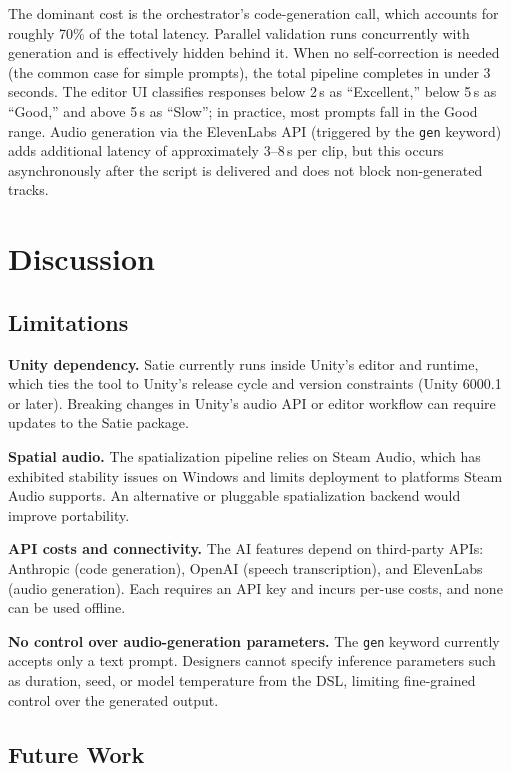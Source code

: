 \documentclass[sigconf,anonymous,review]{nimeart}
\begin{document}
The dominant cost is the orchestrator's code-generation call, which accounts for roughly 70\% of the total latency. Parallel validation runs concurrently with generation and is effectively hidden behind it. When no self-correction is needed (the common case for simple prompts), the total pipeline completes in under 3 seconds. The editor UI classifies responses below 2\,s as ``Excellent,'' below 5\,s as ``Good,'' and above 5\,s as ``Slow''; in practice, most prompts fall in the Good range. Audio generation via the ElevenLabs API (triggered by the \texttt{gen} keyword) adds additional latency of approximately 3--8\,s per clip, but this occurs asynchronously after the script is delivered and does not block non-generated tracks.

\section{Discussion}

\subsection{Limitations}

\textbf{Unity dependency.} Satie currently runs inside Unity's editor and runtime, which ties the tool to Unity's release cycle and version constraints (Unity 6000.1 or later). Breaking changes in Unity's audio API or editor workflow can require updates to the Satie package.

\textbf{Spatial audio.} The spatialization pipeline relies on Steam Audio, which has exhibited stability issues on Windows and limits deployment to platforms Steam Audio supports. An alternative or pluggable spatialization backend would improve portability.

\textbf{API costs and connectivity.} The AI features depend on third-party APIs: Anthropic (code generation), OpenAI (speech transcription), and ElevenLabs (audio generation). Each requires an API key and incurs per-use costs, and none can be used offline.

\textbf{No control over audio-generation parameters.} The \texttt{gen} keyword currently accepts only a text prompt. Designers cannot specify inference parameters such as duration, seed, or model temperature from the DSL, limiting fine-grained control over the generated output.

\subsection{Future Work}
\end{document}
